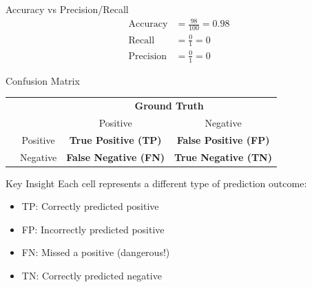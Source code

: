 \documentclass[dvipsnames]{beamer}
\begin{document}
\begin{frame}{Accuracy vs Precision/Recall}
\begin{align*}
\text{Accuracy} &= \frac{98}{100} = 0.98 \\
\text{Recall} &= \frac{0}{1} = 0 \\
\text{Precision} &= \frac{0}{1} = 0
\end{align*}

\end{frame}

\begin{frame}{Confusion Matrix}
\vspace{5pt}
\begin{center}
\begin{tabular}{@{}cc cc@{}}
	\multicolumn{1}{c}{} &\multicolumn{1}{c}{} &\multicolumn{2}{c}{\textbf{Ground Truth}} \\ 
	\cmidrule(lr){3-4}
	\multicolumn{1}{c}{} & 
	\multicolumn{1}{c}{} & 
	\multicolumn{1}{c}{Positive} & 
	\multicolumn{1}{c}{Negative} \\ 
	\cline{2-4}
	\multirow[c]{2}{*}{\rotatebox[origin=tr]{90}{\textbf{Predicted}}}
	& Positive  & \cellcolor{blue!60}\textbf{True Positive (TP)} & \cellcolor{orange!70}\textbf{False Positive (FP)}   \\[1.2ex]
	& Negative  & \cellcolor{red!70}\textbf{False Negative (FN)}   & \cellcolor{gray!30}\textbf{True Negative (TN)} \\ 
	\cline{2-4}
\end{tabular}
\end{center}
\vspace{8pt}
\pause
\begin{alertblock}{Key Insight}
Each cell represents a different type of prediction outcome:
\vspace{-0.5em}
\begin{itemize}
\item \colorbox{blue!60}{TP}: Correctly predicted positive
\item \colorbox{orange!70}{FP}: Incorrectly predicted positive  
\item \colorbox{red!70}{FN}: Missed a positive (dangerous!)
\item \colorbox{gray!30}{TN}: Correctly predicted negative
\end{itemize}
\end{alertblock}
\end{frame}
\end{document}
